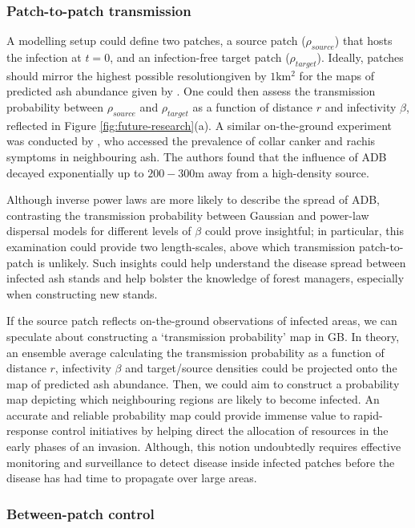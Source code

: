 \subsubsection{Patch-to-patch transmission}
A modelling setup could define two patches, a source patch ($\rho_{source}$) that hosts the infection at $t=0$, and an infection-free target patch ($\rho_{target}$). Ideally, patches should mirror the highest possible resolution\textemdash given by $1\mathrm{km^2}$ for the maps of predicted ash abundance given by \cite{hill.data}.
One could then assess the transmission probability between $\rho_{source}$ and $\rho_{target}$ as a function of distance $r$ and infectivity $\beta$, reflected in Figure \ref{fig:future-research}(a). 
A similar on-the-ground experiment was conducted by \cite{https://doi.org/10.1111/1365-2745.13383},
who accessed the prevalence of collar canker and rachis symptoms in neighbouring ash. 
The authors found that the influence of ADB decayed exponentially up to $200-300\mathrm{m}$ away from a high-density source.

Although inverse power laws are more likely to describe the spread of ADB, contrasting the transmission probability between Gaussian and power-law dispersal models for different levels of $\beta$ could prove insightful; in particular, this examination could provide two length-scales, above which transmission patch-to-patch is unlikely.  Such insights could help understand the disease spread between infected ash stands and help bolster the knowledge of forest managers, especially when constructing new stands.

If the source patch reflects on-the-ground observations of infected areas, we can speculate about constructing a `transmission probability' map in GB. In theory, an ensemble average calculating the transmission probability as a function of distance $r$, infectivity $\beta$ and target/source densities could be projected onto the map of predicted ash abundance.
Then, we could aim to construct a probability map depicting which neighbouring regions are likely to become infected. An accurate and reliable probability map could provide immense value to rapid-response control initiatives by helping direct the allocation of resources in the early phases of an invasion. 
Although, this notion undoubtedly requires effective monitoring and surveillance to detect disease inside infected patches before the disease has had time to propagate over large areas.

\subsubsection{Between-patch control}

